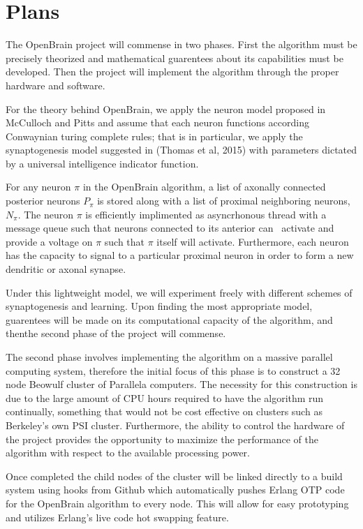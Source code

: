 \documentclass[letter]{article}
\begin{document}
\section{Plans}
The OpenBrain project will commense in two phases. First the algorithm must be precisely theorized and mathematical
guarentees about its capabilities must be developed. Then the project will implement the algorithm through the proper hardware and software.

For the theory behind OpenBrain, we apply the neuron model proposed in McCulloch and Pitts \cite{mcpitts} and assume that each neuron
functions according Conwaynian turing complete rules; that is in particular, we apply the synaptogenesis model suggested in
(Thomas et al, 2015) with parameters dictated by a universal intelligence indicator function.

For any neuron $\pi$ in the OpenBrain algorithm, a list of axonally connected posterior neurons $P_\pi$ is stored along with
a list of proximal neighboring neurons, $N_\pi.$ The neuron $\pi$ is efficiently implimented as asyncrhonous thread with a message
queue such that neurons connected to its anterior can \ activate and provide a voltage on $\pi$ such that $\pi$ itself
will activate. Furthermore, each neuron has the capacity to signal to a particular proximal neuron in order to form a new dendritic or axonal
synapse.

Under this lightweight model, we will experiment freely with different schemes of synaptogenesis and learning. Upon finding the most
appropriate model, guarentees will be made on its computational capacity of the algorithm, and thenthe second
phase of the project will commense.

The second phase involves implementing the algorithm on a massive parallel computing system, therefore the initial
focus of this phase is to construct a 32 node Beowulf cluster of Parallela computers. The necessity for this construction
is due to the large amount of CPU hours required to have the algorithm run continually, something that would not be cost effective
on clusters such as Berkeley's own PSI cluster. Furthermore, the ability to control the hardware of the project provides the opportunity
to maximize the performance of the algorithm with respect to the available processing power.

Once completed the child nodes of the cluster will be linked directly to a build system using hooks from Github which automatically pushes Erlang
OTP code for the OpenBrain algorithm to every node. This will allow for easy prototyping and utilizes Erlang's live code hot swapping feature.
\end{document}
